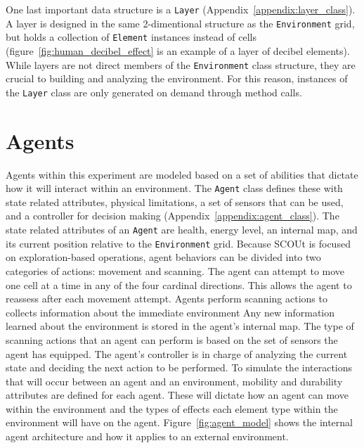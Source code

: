 One last important data structure is a \texttt{Layer} (Appendix~\ref{appendix:layer_class}).
A layer is designed in the same 2-dimentional structure as the \texttt{Environment} grid, but holds a collection of \texttt{Element} instances instead of cells (figure~\ref{fig:human_decibel_effect} is an example of a layer of decibel elements).
While layers are not direct members of the \texttt{Environment} class structure, they are crucial to building and analyzing the environment.
For this reason, instances of the \texttt{Layer} class are only generated on demand through method calls.


\section{Agents} \label{sec:agent}
Agents within this experiment are modeled based on a set of abilities that dictate how it will interact within an environment.
The \texttt{Agent} class defines these with state related attributes, physical limitations, a set of sensors that can be used, and a controller for decision making (Appendix~\ref{appendix:agent_class}).
The state related attributes of an \texttt{Agent} are health, energy level, an internal map, and its current position relative to the \texttt{Environment} grid.
Because SCOUt is focused on exploration-based operations, agent behaviors can be divided into two categories of actions: movement and scanning.
The agent can attempt to move one cell at a time in any of the four cardinal directions.
This allows the agent to reassess after each movement attempt.
Agents perform scanning actions to collects information about the immediate environment
Any new information learned about the environment is stored in the agent's internal map.
The type of scanning actions that an agent can perform is based on the set of sensors the agent has equipped.
The agent's controller is in charge of analyzing the current state and deciding the next action to be performed.
To simulate the interactions that will occur between an agent and an environment, mobility and durability attributes are defined for each agent.
These will dictate how an agent can move within the environment and the types of effects each element type within the environment will have on the agent.
Figure~\ref{fig:agent_model} shows the internal agent architecture and how it applies to an external environment.

